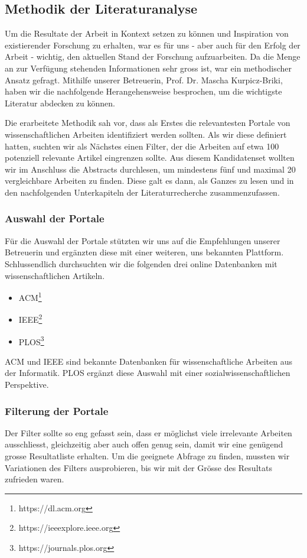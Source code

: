 \subsection{Methodik der Literaturanalyse}

Um die Resultate der Arbeit in Kontext setzen zu können und Inspiration von existierender Forschung zu erhalten,
war es für uns - aber auch für den Erfolg der Arbeit - wichtig, den aktuellen Stand der Forschung aufzuarbeiten.
Da die Menge an zur Verfügung stehenden Informationen sehr gross ist, war ein methodischer Ansatz gefragt.
Mithilfe unserer Betreuerin, Prof. Dr. Mascha Kurpicz-Briki,  haben wir die nachfolgende Herangehensweise besprochen, 
um die wichtigste Literatur abdecken zu können.

Die erarbeitete Methodik sah vor, dass als Erstes die relevantesten Portale von wissenschaftlichen Arbeiten
identifiziert werden sollten. Als wir diese definiert hatten, suchten wir als Nächstes einen Filter, der die Arbeiten auf etwa 100
potenziell relevante Artikel eingrenzen sollte. Aus diesem Kandidatenset wollten wir im Anschluss die Abstracts
durchlesen, um mindestens fünf und maximal 20 vergleichbare Arbeiten zu finden. Diese galt es dann, als Ganzes
zu lesen und in den nachfolgenden Unterkapiteln der Literaturrecherche zusammenzufassen.

\subsubsection{Auswahl der Portale}
Für die Auswahl der Portale stützten wir uns auf die Empfehlungen unserer Betreuerin und ergänzten diese mit
einer weiteren, uns bekannten Plattform. Schlussendlich durchsuchten wir die folgenden drei online Datenbanken mit
wissenschaftlichen Artikeln.
\begin{itemize}
    \item ACM\footnote{https://dl.acm.org}
    \item IEEE\footnote{https://ieeexplore.ieee.org}
    \item PLOS\footnote{https://journals.plos.org}
\end{itemize}
ACM und IEEE sind bekannte Datenbanken für wissenschaftliche Arbeiten aus der Informatik. PLOS ergänzt diese Auswahl mit einer sozialwissenschaftlichen Perspektive.

\subsubsection{Filterung der Portale}
Der Filter sollte so eng gefasst sein, dass er möglichst viele irrelevante Arbeiten ausschliesst, gleichzeitig
aber auch offen genug sein, damit wir eine genügend grosse Resultatliste erhalten. Um die geeignete Abfrage zu finden,
mussten wir Variationen des Filters ausprobieren, bis wir mit der Grösse des Resultats zufrieden waren.

